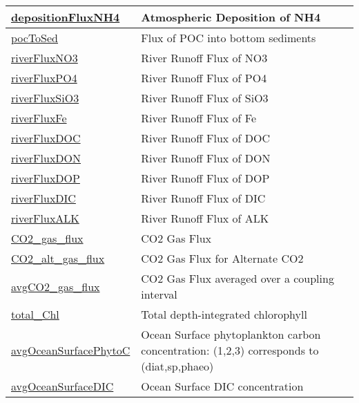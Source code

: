 {\begin{center}
\begin{longtable}{| p{2.0in} | p{4.0in} |}
    \hline
    \hyperref[subsec:var_sec_forcing_depositionFluxNH4]{depositionFluxNH4} & Atmospheric Deposition of NH4 \\
    \hline
    \hyperref[subsec:var_sec_forcing_pocToSed]{pocToSed} & Flux of POC into bottom sediments \\
    \hline
    \hyperref[subsec:var_sec_forcing_riverFluxNO3]{riverFluxNO3} & River Runoff Flux of NO3 \\
    \hline
    \hyperref[subsec:var_sec_forcing_riverFluxPO4]{riverFluxPO4} & River Runoff Flux of PO4 \\
    \hline
    \hyperref[subsec:var_sec_forcing_riverFluxSiO3]{riverFluxSiO3} & River Runoff Flux of SiO3 \\
    \hline
    \hyperref[subsec:var_sec_forcing_riverFluxFe]{riverFluxFe} & River Runoff Flux of Fe \\
    \hline
    \hyperref[subsec:var_sec_forcing_riverFluxDOC]{riverFluxDOC} & River Runoff Flux of DOC \\
    \hline
    \hyperref[subsec:var_sec_forcing_riverFluxDON]{riverFluxDON} & River Runoff Flux of DON \\
    \hline
    \hyperref[subsec:var_sec_forcing_riverFluxDOP]{riverFluxDOP} & River Runoff Flux of DOP \\
    \hline
    \hyperref[subsec:var_sec_forcing_riverFluxDIC]{riverFluxDIC} & River Runoff Flux of DIC \\
    \hline
    \hyperref[subsec:var_sec_forcing_riverFluxALK]{riverFluxALK} & River Runoff Flux of ALK \\
    \hline
    \hyperref[subsec:var_sec_forcing_CO2_gas_flux]{CO2\_gas\_flux} & CO2 Gas Flux \\
    \hline
    \hyperref[subsec:var_sec_forcing_CO2_alt_gas_flux]{CO2\_alt\_gas\_flux} & CO2 Gas Flux for Alternate CO2 \\
    \hline
    \hyperref[subsec:var_sec_forcing_avgCO2_gas_flux]{avgCO2\_gas\_flux} & CO2 Gas Flux averaged over a coupling interval \\
    \hline
    \hyperref[subsec:var_sec_forcing_total_Chl]{total\_Chl} & Total depth-integrated chlorophyll \\
    \hline
    \hyperref[subsec:var_sec_forcing_avgOceanSurfacePhytoC]{avgOceanSurfacePhytoC} & Ocean Surface phytoplankton carbon concentration: (1,2,3) corresponds to (diat,sp,phaeo) \\
    \hline
    \hyperref[subsec:var_sec_forcing_avgOceanSurfaceDIC]{avgOceanSurfaceDIC} & Ocean Surface DIC concentration \\

\end{longtable}
\end{center}}
